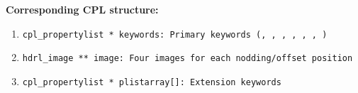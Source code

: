 \begin{datastructdef}
\textbf{Corresponding \ac{CPL} structure:}
\begin{enumerate}
    \item \texttt{cpl\_propertylist * keywords: Primary keywords (,  ,  ,  ,  ,  , )}
    \item \texttt{hdrl\_image ** image: Four images for each nodding/offset position}
    \item \texttt{cpl\_propertylist * plistarray[]: Extension keywords}
\end{enumerate}
\end{datastructdef}


